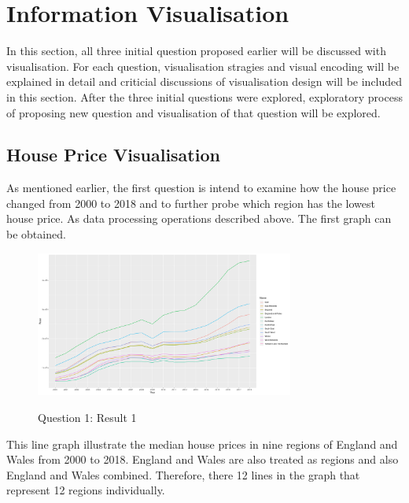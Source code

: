 \documentclass{article}
\begin{document}
\section{Information Visualisation}
In this section, all three initial question proposed earlier will be discussed with visualisation. 
For each question, visualisation stragies and visual encoding will be explained in detail and 
criticial discussions of visualisation design will be included in this section. After the three initial 
questions were explored, exploratory process of proposing new question and visualisation of that question 
will be explored.

\subsection{House Price Visualisation}
As mentioned earlier, the first question is intend to examine how the house price changed from 2000 to 2018 
and to further probe which region has the lowest house price. As data processing operations described above. 
The first graph can be obtained.

\begin{figure}[htb]
  \begin{minipage}[b]{1.0\linewidth}
    \centering
    \centerline{\includegraphics[width=8.5cm]{Q1Geom_line}}
    \centerline{Question 1: Result 1}\medskip
  \end{minipage}
\end{figure}

This line graph illustrate the median house prices in nine regions of England and Wales from 2000 to 2018. 
England and Wales are also treated as regions and also England and Wales combined. Therefore, there 12 lines 
in the graph that represent 12 regions individually. 
\end{document}
